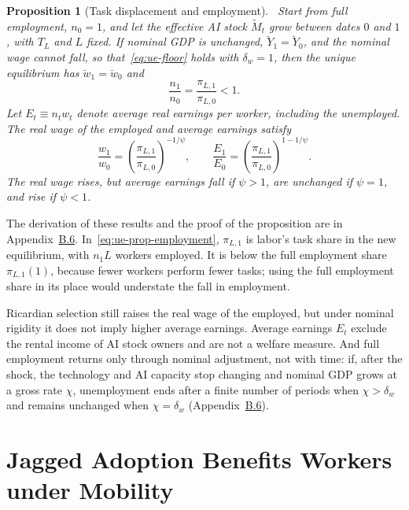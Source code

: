 \documentclass[11pt]{article}
\newtheorem{proposition}{Proposition}
\begin{document}
\begin{proposition}[Task displacement and employment]\label{prop:unemployment}
~Start from full employment, $n_{0}=1$, and let the effective AI stock
$\widetilde{M}_{t}$ grow between dates $0$ and $1$, with $T_{L}$
and $L$ fixed. If nominal GDP is unchanged, $\breve{Y}_{1}=\breve{Y}_{0}$,
and the nominal wage cannot fall, so that~\eqref{eq:ue-floor} holds
with $\delta_{w}=1$, then the unique equilibrium has $\breve{w}_{1}=\breve{w}_{0}$
and
\begin{equation}
\frac{n_{1}}{n_{0}}=\frac{\pi_{L,1}}{\pi_{L,0}}<1.\label{eq:ue-prop-employment}
\end{equation}
Let $E_{t}\equiv n_{t}w_{t}$ denote average real earnings per worker,
including the unemployed. The real wage of the employed and average
earnings satisfy
\begin{equation}
\frac{w_{1}}{w_{0}}=\left(\frac{\pi_{L,1}}{\pi_{L,0}}\right)^{-1/\psi},\qquad\frac{E_{1}}{E_{0}}=\left(\frac{\pi_{L,1}}{\pi_{L,0}}\right)^{1-1/\psi}.\label{eq:ue-prop-earnings}
\end{equation}
The real wage rises, but average earnings fall if $\psi>1$, are unchanged
if $\psi=1$, and rise if $\psi<1$.\end{proposition}

The derivation of these results and the proof of the proposition are
in Appendix~\href{https://ahmadlp.github.io/Lashkaripour_AI_Displacement_Online_Appendix.pdf\#page=30}{B.6}. In~\eqref{eq:ue-prop-employment},
$\pi_{L,1}$ is labor's task share in the new equilibrium, with $n_{1}L$
workers employed. It is below the full employment share $\pi_{L,1}(1)$,
because fewer workers perform fewer tasks; using the full employment
share in its place would understate the fall in employment.

Ricardian selection still raises the real wage of the employed, but
under nominal rigidity it does not imply higher average earnings.
Average earnings $E_{t}$ exclude the rental income of AI stock owners
and are not a welfare measure. And full employment returns only through
nominal adjustment, not with time: if, after the shock, the technology
and AI capacity stop changing and nominal GDP grows at a gross rate
$\chi$, unemployment ends after a finite number of periods when $\chi>\delta_{w}$
and remains unchanged when $\chi=\delta_{w}$ (Appendix~\href{https://ahmadlp.github.io/Lashkaripour_AI_Displacement_Online_Appendix.pdf\#page=30}{B.6}).

\section{Jagged Adoption Benefits Workers under Mobility}\label{sec:breadth}
\end{document}
